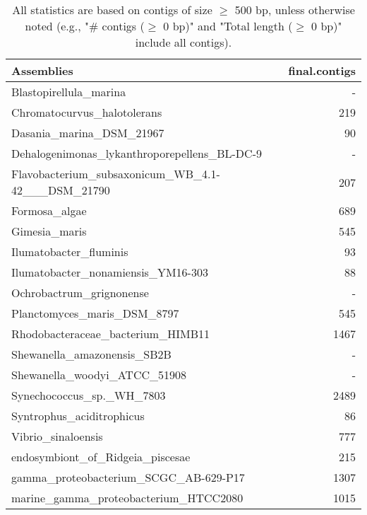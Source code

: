 \documentclass[12pt,a4paper]{article}
\begin{document}
\begin{table}[ht]
\begin{center}
\caption{All statistics are based on contigs of size $\geq$ 500 bp, unless otherwise noted (e.g., "\# contigs ($\geq$ 0 bp)" and "Total length ($\geq$ 0 bp)" include all contigs).}
\begin{tabular}{|l*{1}{|r}|}
\hline
Assemblies & final.contigs \\ \hline
Blastopirellula\_marina & - \\ \hline
Chromatocurvus\_halotolerans & 219 \\ \hline
Dasania\_marina\_DSM\_21967 & 90 \\ \hline
Dehalogenimonas\_lykanthroporepellens\_BL-DC-9 & - \\ \hline
Flavobacterium\_subsaxonicum\_WB\_4.1-42\_\_\_DSM\_21790 & 207 \\ \hline
Formosa\_algae & 689 \\ \hline
Gimesia\_maris & 545 \\ \hline
Ilumatobacter\_fluminis & 93 \\ \hline
Ilumatobacter\_nonamiensis\_YM16-303 & 88 \\ \hline
Ochrobactrum\_grignonense & - \\ \hline
Planctomyces\_maris\_DSM\_8797 & 545 \\ \hline
Rhodobacteraceae\_bacterium\_HIMB11 & 1467 \\ \hline
Shewanella\_amazonensis\_SB2B & - \\ \hline
Shewanella\_woodyi\_ATCC\_51908 & - \\ \hline
Synechococcus\_sp.\_WH\_7803 & 2489 \\ \hline
Syntrophus\_aciditrophicus & 86 \\ \hline
Vibrio\_sinaloensis & 777 \\ \hline
endosymbiont\_of\_Ridgeia\_piscesae & 215 \\ \hline
gamma\_proteobacterium\_SCGC\_AB-629-P17 & 1307 \\ \hline
marine\_gamma\_proteobacterium\_HTCC2080 & 1015 \\ \hline
\end{tabular}
\end{center}
\end{table}
\end{document}
